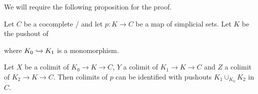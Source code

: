 We will require the following proposition for the proof.
\begin{prop}\label{prop:colimitDecompositionPushouts}
    Let $C$ be a cocomplete \inftycat/ and let $p\colon K\to C$ be a map of simplicial sets. 
    Let $K$ be the pushout of
    \begin{center}
    \end{center}
    where $K_0\xhookrightarrow{} K_1$ is a monomorphism.

    Let $X$ be a colimit of $K_0\to K\to C$, $Y$ a colimit of $K_1\to K\to C$ and $Z$ a colimit of $K_2\to K\to C$.
    Then colimits of $p$ can be identified with pushouts $K_1\cup_{K_0}K_2$ in $C$.
    \begin{reference}
        \cite[Proposition 4.4.2.2]{HTT}
    \end{reference}
\end{prop}
